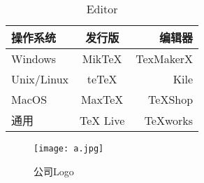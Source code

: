 \documentclass[UTF8]{ctexart}
\begin{document}
\begin{table}[htbp]
\centering
\begin{tabular}{|l|c|r|}
\hline
操作系统 & 发行版 & 编辑器\\
\hline
Windows & MikTeX & TexMakerX \\
\hline
Unix/Linux & teTeX & Kile \\
\hline
MacOS  & MaxTeX  & TeXShop \\
\hline
通用 & TeX Live & TeXworks \\
\hline
\end{tabular}
\caption{Editor}
\label{tbl:editor}
\end{table}


\begin{figure}[htbp]
\centering
\texttt{[image: a.jpg]}
\caption{公司Logo}
\label{fig:myphoto}
\end{figure}
\end{document}
